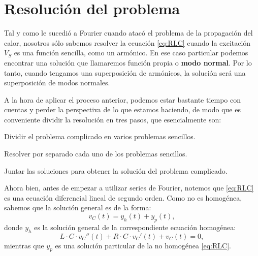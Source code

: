 \section{Resolución del problema}
Tal y como le sucedió a Fourier cuando atacó el problema de la propagación del calor, nosotros sólo sabemos resolver la ecuación \eqref{eq:RLC} cuando la excitación $V_S$ es una función sencilla, como un armónico. En ese caso particular podemos encontrar una solución que llamaremos función propia o \textbf{modo normal}. Por lo tanto, cuando tengamos una superposición de armónicos, la solución será una superposición de modos normales.

A la hora de aplicar el proceso anterior, podemos estar bastante tiempo con cuentas y perder la perspectiva de lo que estamos haciendo, de modo que es conveniente dividir la resolución en tres pasos, que esencialmente son:
\begin{mybox}
  \begin{enumerate}[{\bfseries [R1]}]
  \item Dividir el problema complicado en varios problemas sencillos.
  \item Resolver por separado cada uno de los problemas sencillos.
  \item Juntar las soluciones para obtener la solución del problema complicado.
\end{enumerate}
\end{mybox}

Ahora bien, antes de empezar a utilizar series de Fourier, notemos que \eqref{eq:RLC} es una ecuación diferencial lineal de segundo orden. Como no es homogénea, sabemos que  la solución general es de la forma:
\[
v_C(t) = y_h(t) + y_p(t),
\]
donde $y_h$ es la solución general de la correspondiente ecuación homogénea:
\begin{equation}
  \label{eq:HomogeneaRLC}
  L\cdot C \cdot v_C '' (t) + R\cdot C\cdot v_C'(t) + v_C(t) = 0,
\end{equation}
 mientras que $y_p$ es una solución particular de la no homogénea \eqref{eq:RLC}.

